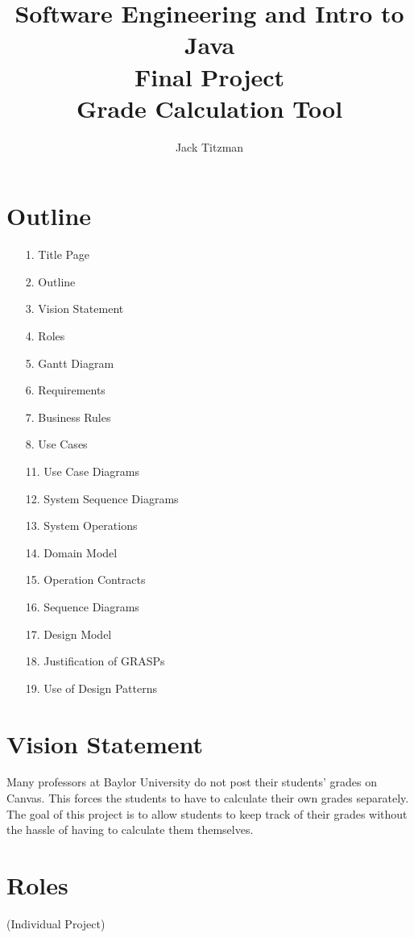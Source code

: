 \documentclass[12pt]{article}
\title{Software Engineering and Intro to Java\\Final Project\\Grade Calculation Tool}
\author{Jack Titzman}
\date{}
\begin{document}
\maketitle 

\newpage

\section*{Outline}
\begin{enumerate}
	\item[1.] Title Page
	\item[2.] Outline
	\item[3.] Vision Statement
	\item[4.] Roles
	\item[5.] Gantt Diagram
	\item[6.] Requirements
	\item[7.] Business Rules
	\item[8.] Use Cases
	\item[11.] Use Case Diagrams
	\item[12.] System Sequence Diagrams
	\item[13.] System Operations
	\item[14.] Domain Model
	\item[15.] Operation Contracts
	\item[16.] Sequence Diagrams
	\item[17.] Design Model
	\item[18.] Justification of GRASPs
	\item[19.] Use of Design Patterns
\end{enumerate}
\newpage

\section*{Vision Statement}

Many professors at Baylor University do not post their students' grades on Canvas. This forces the students to have to calculate their own grades separately. The goal of this project is to allow students to keep track of their grades without the hassle of having to calculate them themselves.

\newpage

\section*{Roles}

(Individual Project)
\end{document}
